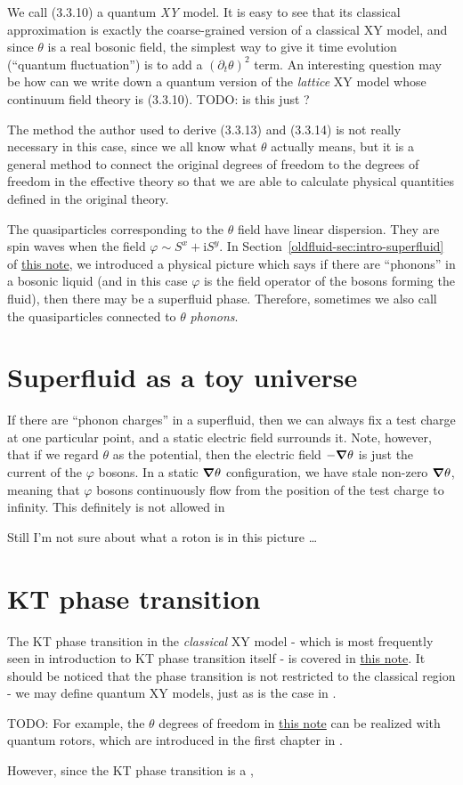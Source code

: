 \documentclass[hyperref, a4paper]{article}
\newcommand*{\ii}{\mathrm{i}}
\newcommand{\oldfluid}{\href{fluid.pdf}{this note}}
\newcommand{\ktnote}{\href{../topological-phases-reading-notes/kt.pdf}{this note}}
\begin{document}
We call (3.3.10) a quantum \emph{XY} model. It is easy to see that its classical approximation is 
exactly the coarse-grained version of a classical XY model, and since $\theta$ is a real bosonic field,
the simplest way to give it time evolution (``quantum fluctuation'') is to add a $(\partial_t \theta)^2$
term. An interesting question may be how can we write down a quantum version of the \emph{lattice} XY 
model whose continuum field theory is (3.3.10). TODO: is this just \cite{latticemodel,Z_iga_2014}?

The method the author used to derive (3.3.13) and (3.3.14) is not really necessary in this case, 
since we all know what $\theta$ actually means, but it is a general method to connect the original 
degrees of freedom to the degrees of freedom in the effective theory so that we are able to calculate 
physical quantities defined in the original theory.

The quasiparticles corresponding to the $\theta$ field have linear dispersion. They are spin waves when 
the field $\varphi \sim S^x + \ii S^y$. In Section~\ref{oldfluid-sec:intro-superfluid} of \oldfluid,
we introduced a physical picture which says if there are ``phonons'' in a bosonic liquid (and in this case 
$\varphi$ is the field operator of the bosons forming the fluid), then there may be a superfluid phase.
Therefore, sometimes we also call the quasiparticles connected to $\theta$ \emph{phonons}.

\section{Superfluid as a toy universe}

If there are ``phonon charges'' in a superfluid, then we can always fix a test charge at one particular 
point, and a static electric field surrounds it. Note, however, that if we regard $\theta$ as the potential,
then the electric field $- \grad \theta$ is just the current of the $\varphi$ bosons. In a static $\grad{\theta}$
configuration, we have stale non-zero $\grad{\theta}$, meaning that $\varphi$ bosons continuously flow from 
the position of the test charge to infinity. This definitely is not allowed in 

Still I'm not sure about what a roton is in this picture \ldots

\section{KT phase transition}

The KT phase transition in the \emph{classical} XY model - which is most frequently 
seen in introduction to KT phase transition itself - is covered in \ktnote. It should be noticed that the 
phase transition is not restricted to the classical region - we may define quantum XY models, just as
is the case in . 

TODO: For example, the $\theta$ degrees of freedom in \ktnote{} can be realized with quantum rotors, which are 
introduced in the first chapter in \cite{Sachdev2009}. 

However, since the KT phase transition is a , 


 
\end{document}
